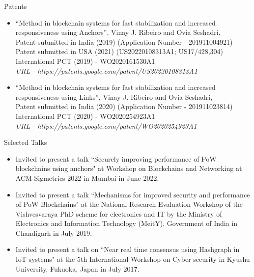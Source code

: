 \documentclass{resume} %
\begin{document}
\begin{rSection}{Patents}
\begin{itemize}
\item “Method in blockchain systems for fast stabilization and increased responsiveness using Anchors”, Vinay J. Ribeiro and Ovia Seshadri, \\
	Patent submitted in India (2019) (Application Number - 201911004921) \\
	Patent submitted in USA (2021) (US20220108313A1; US17/428,304)\\
	International PCT (2019) - WO2020161530A1\\
	\textit{URL - https://patents.google.com/patent/US20220108313A1}
	
	
	\item “Method in blockchain systems for fast stabilization and increased responsiveness using Links”, Vinay J. Ribeiro and Ovia Seshadri, \\
	Patent submitted in India (2020) (Application Number - 201911023814)\\
	International PCT (2020) - WO2020254923A1\\
	\textit{URL - https://patents.google.com/patent/WO2020254923A1}
\end{itemize}
\end{rSection}

\begin{rSection}{Selected Talks}
\begin{itemize}
\item Invited to present a talk ``Securely improving performance of PoW blockchains using anchors" at Workshop on Blockchains and Networking at ACM Sigmetrics 2022 in Mumbai in June 2022.

\item Invited to present a talk ``Mechanisms for improved security and performance of PoW Blockchains" at the National Research Evaluation Workshop of the Vishvesvaraya PhD scheme for electronics and IT by the Ministry of Electronics and Information Technology (MeitY), Government of India in Chandigarh in July 2019.

\item Invited to present a talk on ``Near real time consensus using Hashgraph in IoT systems" at the 5th International Workshop on Cyber security in Kyushu University, Fukuoka, Japan in July 2017.
\end{itemize}
\end{rSection}


\end{document}
